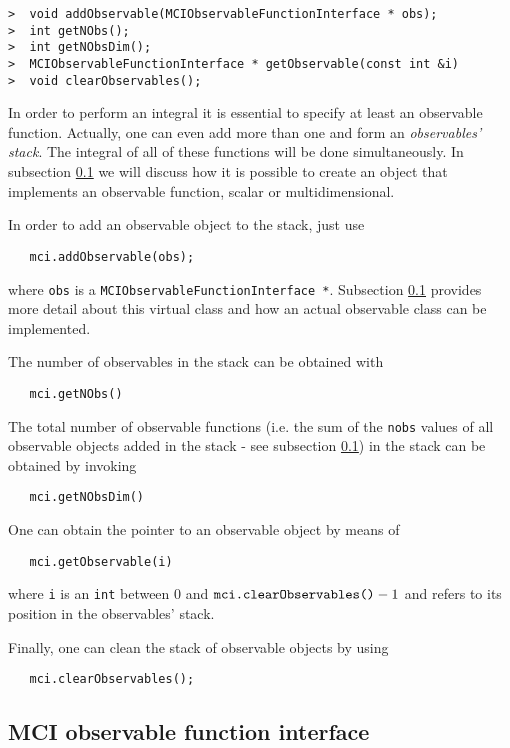 \documentclass[11pt,a4paper,twoside]{article}
\begin{document}
\begin{verbatim}
>  void addObservable(MCIObservableFunctionInterface * obs);
>  int getNObs();
>  int getNObsDim();
>  MCIObservableFunctionInterface * getObservable(const int &i)
>  void clearObservables();
\end{verbatim}

In order to perform an integral it is essential to specify at least an observable function.
Actually, one can even add more than one and form an \emph{observables' stack}.
The integral of all of these functions will be done simultaneously.
In subsection \ref{sub:mciobservablefunctioninterface} we will discuss how it is possible to create an object that implements an observable function, scalar or multidimensional.

In order to add an observable object to the stack, just use
\begin{verbatim}
   mci.addObservable(obs);
\end{verbatim}
where \verb+obs+ is a \verb+MCIObservableFunctionInterface *+.
Subsection \ref{sub:mciobservablefunctioninterface} provides more detail about this virtual class and how an actual observable class can be implemented.

The number of observables in the stack can be obtained with
\begin{verbatim}
   mci.getNObs()
\end{verbatim}

The total number of observable functions (i.e. the sum of the \verb+nobs+ values of all observable objects added in the stack - see subsection \ref{sub:mciobservablefunctioninterface}) in the stack can be obtained by invoking
\begin{verbatim}
   mci.getNObsDim()
\end{verbatim}

One can obtain the pointer to an observable object by means of
\begin{verbatim}
   mci.getObservable(i)
\end{verbatim}
where \verb+i+ is an \verb+int+ between $0$ and $\verb+mci.clearObservables()+ -1$ and refers to its position in the observables' stack.

Finally, one can clean the stack of observable objects by using
\begin{verbatim}
   mci.clearObservables();
\end{verbatim}


\subsection{MCI observable function interface} %
\label{sub:mciobservablefunctioninterface}
\end{document}
